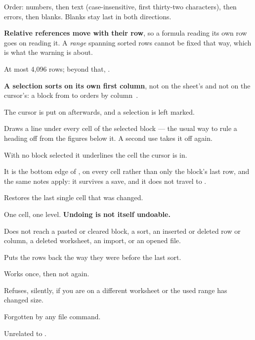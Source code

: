 \begin{ccsteps}
\item Order: numbers, then text (case-insensitive, first thirty-two
characters), then errors, then blanks. Blanks stay last in both directions.
\item \textbf{Relative references move with their row}, so a formula reading
its own row goes on reading it. A \emph{range} spanning sorted rows cannot be
fixed that way, which is what the warning is about.
\item At most 4,096 rows; beyond that, .
\item \textbf{A selection sorts on its own first column}, not on the sheet's
and not on the cursor's: a block from  to  orders by
column~.
\item The cursor is put on  afterwards, and a selection is left
marked.
\end{ccsteps}


Draws a line under every cell of the selected block --- the usual way to rule
a heading off from the figures below it. A second use takes it off again.

With no block selected it underlines the cell the cursor is in.

It is the bottom edge of , on every cell rather
than only the block's last row, and the same notes apply: it survives a
save, and it does not travel to .


Restores the last single cell that was changed.

\begin{ccsteps}
\item One cell, one level. \textbf{Undoing is not itself undoable.}
\item Does not reach a pasted or cleared block, a sort, an inserted or deleted
row or column, a deleted worksheet, an import, or an opened file.
\end{ccsteps}


Puts the rows back the way they were before the last sort.

\begin{ccsteps}
\item Works once, then not again.
\item Refuses, silently, if you are on a different worksheet or the used range
has changed size.
\item Forgotten by any file command.
\item Unrelated to  .
\end{ccsteps}
